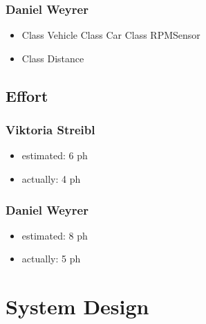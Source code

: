 \subsubsection{Daniel Weyrer}
\begin{itemize}
	\item Class Vehicle
		\subitem Class Car
		\subitem Class RPMSensor
	\item Class Distance
	
	
\end{itemize}

\subsection{Effort}

\subsubsection {Viktoria Streibl}
\begin{itemize}
	\item estimated: 6 ph 
	\item actually: 4 ph
\end{itemize}

\subsubsection {Daniel Weyrer}
\begin{itemize}
	\item estimated: 8 ph 
	\item actually: 5 ph
\end{itemize}


\section{System Design}
